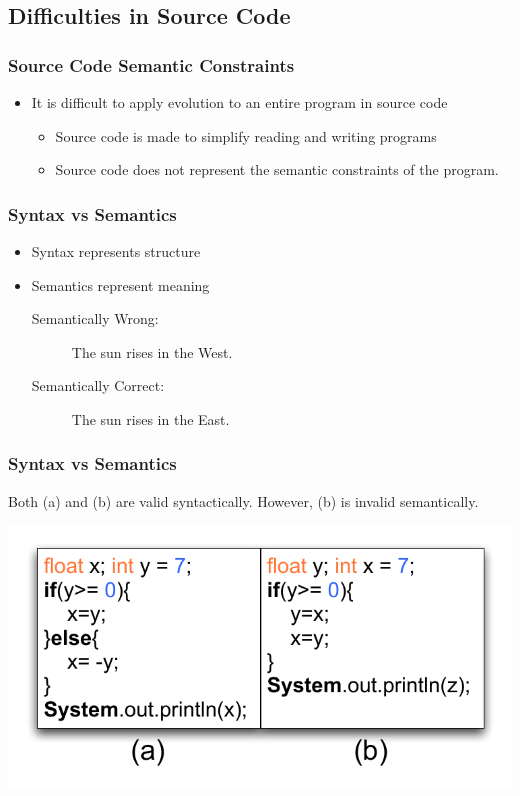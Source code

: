 \documentclass{beamer}
\begin{document}
\subsection{Difficulties in Source Code}
\begin{frame}
	\frametitle{Source Code Semantic Constraints}
	\begin{itemize}
		\item It is difficult to apply evolution to an entire program in source code
			\\
		\begin{itemize}
			\item Source code is made to simplify reading and writing programs
			\item Source code does not represent the semantic constraints of the program.
		\end{itemize}
	\end{itemize}	
\end{frame}

\begin{frame}
	\frametitle{Syntax vs Semantics}
\begin{itemize}
\item Syntax represents structure
\item Semantics represent meaning
	\\
\begin{description}

\item[Semantically Wrong:] The sun rises in the West.  
\item[Semantically Correct:] The sun rises in the East.
\end{description}
\end{itemize}

\end{frame}


\begin{frame}[fragile]
	\frametitle{Syntax vs Semantics}
	Both (a) and (b) are valid syntactically. However, (b) is invalid semantically.
	
	
   \includegraphics[width=1\textwidth]{Illustrations/semantics.pdf}


\end{frame}
\end{document}
